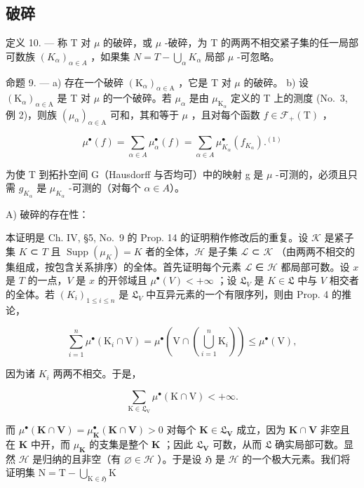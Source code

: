 \subsection{破碎}

定义 10. --- 称 T 对 \(\mu\) 的破碎，或 \(\mu\) -破碎，为 T 的两两不相交紧子集的任一局部可数族 \((K_{\alpha})_{\alpha \in A}\) ，如果集 \(N = T - \bigcup_{\alpha} K_{\alpha}\) 局部 \(\mu\) -可忽略。

命题 9. --- a) 存在一个破碎 \((\mathrm{K}_{\alpha})_{\alpha \in \mathrm{A}}\) ，它是 T 对 \(\mu\) 的破碎。 b) 设 \((\mathrm{K}_{\alpha})_{\alpha \in \mathrm{A}}\) 是 T 对 \(\mu\) 的一个破碎。若 \(\mu_{\alpha}\) 是由 \(\mu_{\mathrm{K}_{\alpha}}\) 定义的 T 上的测度 (No.~3, 例 2)，则族 \((\mu_{\alpha})_{\alpha \in \mathrm{A}}\) 可和，其和等于 \(\mu\) ，且对每个函数 \(f \in \mathcal{F}_{+}(\mathrm{T})\) ，

\[
\mu^ {\bullet} (f) = \sum_ {\alpha \in A} \mu_ {\alpha} ^ {\bullet} (f) = \sum_ {\alpha \in A} \mu_ {K _ {\alpha}} ^ {\bullet} (f _ {K _ {\alpha}}). ^ {(1)}\tag{7}
\]

为使 T 到拓扑空间 G（Hausdorff 与否均可）中的映射 g 是 \(\mu\) -可测的，必须且只需 \(g_{K_{\alpha}}\) 是 \(\mu_{K_{\alpha}}\) -可测的（对每个 \(\alpha \in A\)）。

A) 破碎的存在性：

本证明是 Ch. IV, §5, No.~9 的 Prop. 14 的证明稍作修改后的重复。设 \(\mathcal{K}\) 是紧子集 \(K\) ⊂ \(T\) 且 \(\operatorname{Supp}(\mu_K) = K\) 者的全体，\(\mathcal{H}\) 是子集 \(\mathcal{L}\) ⊂ \(\mathcal{K}\) （由两两不相交的集组成，按包含关系排序）的全体。首先证明每个元素 \(\mathcal{L}\) ∈ \(\mathcal{H}\) 都局部可数。设 \(x\) 是 \(T\) 的一点，\(V\) 是 \(x\) 的开邻域且 \(\mu^\bullet(V) < +\infty\) ；设 \(\mathfrak{L}_V\) 是 \(K \in \mathfrak{L}\) 中与 \(V\) 相交者的全体。若 \((K_i)_{1 \leqslant i \leqslant n}\) 是 \(\mathfrak{L}_V\) 中互异元素的一个有限序列，则由 Prop. 4 的推论，

\[
\sum_ {i = 1} ^ {n} \mu^ {\bullet} (\mathrm{K} _ {i} \cap \mathrm{V}) = \mu^ {\bullet} \left(\mathrm{V} \cap \left(\bigcup_ {i = 1} ^ {n} \mathrm{K} _ {i}\right)\right) \leqslant \mu^ {\bullet} (\mathrm{V}),
\]

因为诸 \(K_{i}\) 两两不相交。于是，

\[
\sum_ {\mathrm{K} \in \mathfrak {L} _ {\mathrm{V}}} \mu^ {\bullet} (\mathrm{K} \cap \mathrm{V}) <   + \infty .
\]

而 \(\mu^{\bullet}(\mathbf{K}\cap \mathbf{V}) = \mu_{\mathbf{K}}^{\bullet}(\mathbf{K}\cap \mathbf{V}) > 0\) 对每个 \(\mathbf{K}\in \mathfrak{L}_{\mathbf{V}}\) 成立，因为 \(\mathbf{K}\cap \mathbf{V}\) 非空且在 \(\mathbf{K}\) 中开，而 \(\mu_{\mathbf{K}}\) 的支集是整个 \(\mathbf{K}\) ；因此 \(\mathfrak{L}_{\mathbf{V}}\) 可数，从而 \(\mathfrak{L}\) 确实局部可数。显然 \(\mathcal{H}\) 是归纳的且非空（有 \(\varnothing \in \mathcal{H}\) ）。于是设 \(\mathfrak{H}\) 是 \(\mathcal{H}\) 的一个极大元素。我们将证明集 \(\mathrm{N} = \mathrm{T} - \bigcup_{\mathrm{K}\in \mathfrak{H}}\mathrm{K}\)

